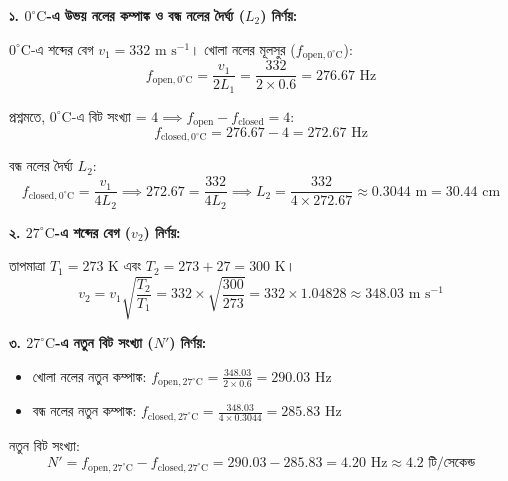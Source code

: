 \documentclass[12pt, a4paper]{article}
\begin{document}
\begin{tcolorbox}[solutionbox={সমাধান (Solution)}]
\noindent
\textbf{১. $0^\circ\text{C}$-এ উভয় নলের কম্পাঙ্ক ও বন্ধ নলের দৈর্ঘ্য ($L_2$) নির্ণয়:}

\vspace{0.3em}
\noindent
$0^\circ\text{C}$-এ শব্দের বেগ $v_1 = 332\text{ m s}^{-1}$। খোলা নলের মূলসুর ($f_{\text{open}, 0^\circ\text{C}}$):
\[ f_{\text{open}, 0^\circ\text{C}} = \frac{v_1}{2 L_1} = \frac{332}{2 \times 0.6} = 276.67\text{ Hz} \]

\noindent
প্রশ্নমতে, $0^\circ\text{C}$-এ বিট সংখ্যা = $4 \implies f_{\text{open}} - f_{\text{closed}} = 4$:
\[ f_{\text{closed}, 0^\circ\text{C}} = 276.67 - 4 = 272.67\text{ Hz} \]

\noindent
বন্ধ নলের দৈর্ঘ্য $L_2$:
\[ f_{\text{closed}, 0^\circ\text{C}} = \frac{v_1}{4 L_2} \implies 272.67 = \frac{332}{4 L_2} \implies L_2 = \frac{332}{4 \times 272.67} \approx 0.3044\text{ m} = 30.44\text{ cm} \]

\vspace{1em}
\noindent
\textbf{২. $27^\circ\text{C}$-এ শব্দের বেগ ($v_2$) নির্ণয়:}

\vspace{0.3em}
\noindent
তাপমাত্রা $T_1 = 273\text{ K}$ এবং $T_2 = 273 + 27 = 300\text{ K}$।
\[ v_2 = v_1 \sqrt{\frac{T_2}{T_1}} = 332 \times \sqrt{\frac{300}{273}} = 332 \times 1.04828 \approx 348.03\text{ m s}^{-1} \]

\vspace{1em}
\noindent
\textbf{৩. $27^\circ\text{C}$-এ নতুন বিট সংখ্যা ($N'$) নির্ণয়:}

\begin{itemize}[leftmargin=2em, itemsep=0.3em]
    \item খোলা নলের নতুন কম্পাঙ্ক: $f_{\text{open}, 27^\circ\text{C}} = \frac{348.03}{2 \times 0.6} = 290.03\text{ Hz}$
    \item বন্ধ নলের নতুন কম্পাঙ্ক: $f_{\text{closed}, 27^\circ\text{C}} = \frac{348.03}{4 \times 0.3044} = 285.83\text{ Hz}$
\end{itemize}

\vspace{0.3em}
\noindent
নতুন বিট সংখ্যা:
\[ N' = f_{\text{open}, 27^\circ\text{C}} - f_{\text{closed}, 27^\circ\text{C}} = 290.03 - 285.83 = 4.20\text{ Hz} \approx 4.2\text{ টি/সেকেন্ড} \]
\end{tcolorbox}
\end{document}
